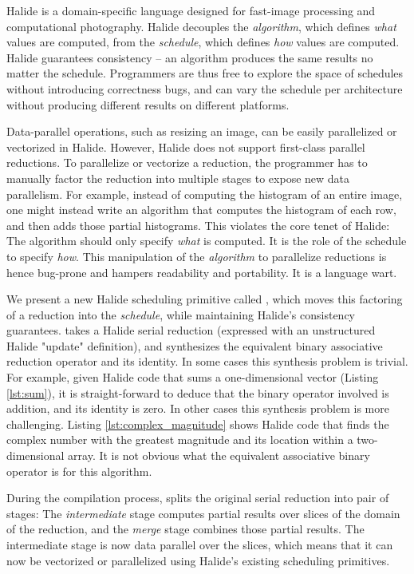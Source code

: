 Halide \cite{Ragan-Kelley:2013:HLC:2491956.2462176} is a domain-specific language designed for fast-image processing and computational photography. Halide decouples the \emph{algorithm}, which defines \emph{what} values are computed, from the \emph{schedule}, which defines \emph{how} values are computed. Halide guarantees consistency -- an algorithm produces the same results no matter the schedule. Programmers are thus free to explore the space of schedules without introducing correctness bugs, and can vary the schedule per architecture without producing different results on different platforms.

Data-parallel operations, such as resizing an image, can be easily parallelized or vectorized in Halide. However, Halide does not support first-class parallel reductions. To parallelize or vectorize a reduction, the programmer has to manually factor the reduction into multiple stages to expose new data parallelism. For example, instead of computing the histogram of an entire image, one might instead write an algorithm that computes the histogram of each row, and then adds those partial histograms. This violates the core tenet of Halide: The algorithm should only specify \emph{what} is computed. It is the role of the schedule to specify \emph{how}. This manipulation of the \emph{algorithm} to parallelize reductions is hence bug-prone and hampers readability and portability. It is a language wart.

We present a new Halide scheduling primitive called , which moves this factoring of a reduction into the \emph{schedule}, while maintaining Halide's consistency guarantees.  takes a Halide serial reduction (expressed with an unstructured Halide "update" definition), and synthesizes the equivalent binary associative reduction operator and its identity. In some cases this synthesis problem is trivial. For example, given Halide code that sums a one-dimensional vector (Listing \ref{lst:sum}), it is straight-forward to deduce that the binary operator involved is addition, and its identity is zero. In other cases this synthesis problem is more challenging. Listing \ref{lst:complex_magnitude} shows Halide code that finds the complex number with the greatest magnitude and its location within a two-dimensional array. It is not obvious what the equivalent associative binary operator is for this algorithm.

During the compilation process,  splits the original serial reduction into pair of stages: The \emph{intermediate} stage computes partial results over slices of the domain of the reduction, and the \emph{merge} stage combines those partial results. The intermediate stage is now data parallel over the slices, which means that it can now be vectorized or parallelized using Halide's existing scheduling primitives.

